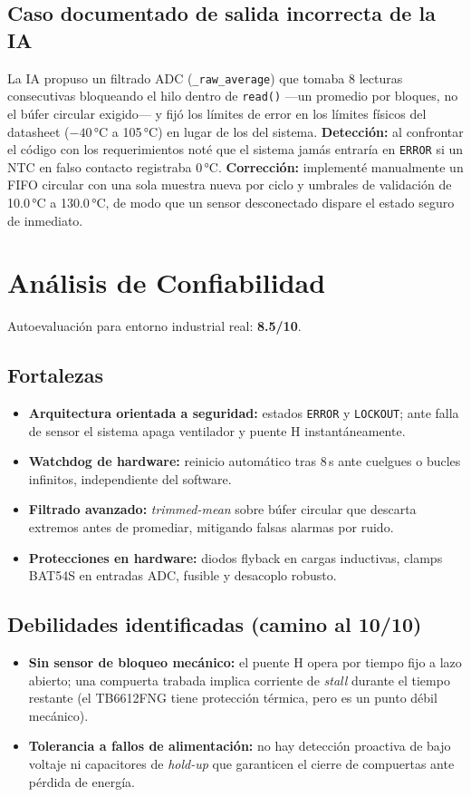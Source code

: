 \documentclass[11pt,letterpaper]{article}
\begin{document}
\subsection{Caso documentado de salida incorrecta de la IA}
La IA propuso un filtrado ADC (\texttt{\_raw\_average}) que tomaba 8 lecturas
consecutivas bloqueando el hilo dentro de \texttt{read()} ---un promedio por bloques,
no el búfer circular exigido--- y fijó los límites de error en los límites físicos del
datasheet ($-40$\,°C a 105\,°C) en lugar de los del sistema. \textbf{Detección:} al
confrontar el código con los requerimientos noté que el sistema jamás entraría en
\texttt{ERROR} si un NTC en falso contacto registraba 0\,°C. \textbf{Corrección:}
implementé manualmente un FIFO circular con una sola muestra nueva por ciclo y umbrales
de validación de 10.0\,°C a 130.0\,°C, de modo que un sensor desconectado dispare el
estado seguro de inmediato.

\section{Análisis de Confiabilidad}
Autoevaluación para entorno industrial real: \textbf{8.5/10}.

\subsection{Fortalezas}
\begin{itemize}
  \item \textbf{Arquitectura orientada a seguridad:} estados \texttt{ERROR} y \texttt{LOCKOUT}; ante falla de sensor el sistema apaga ventilador y puente H instantáneamente.
  \item \textbf{Watchdog de hardware:} reinicio automático tras 8\,s ante cuelgues o bucles infinitos, independiente del software.
  \item \textbf{Filtrado avanzado:} \emph{trimmed-mean} sobre búfer circular que descarta extremos antes de promediar, mitigando falsas alarmas por ruido.
  \item \textbf{Protecciones en hardware:} diodos flyback en cargas inductivas, clamps BAT54S en entradas ADC, fusible y desacoplo robusto.
\end{itemize}

\subsection{Debilidades identificadas (camino al 10/10)}
\begin{itemize}
  \item \textbf{Sin sensor de bloqueo mecánico:} el puente H opera por tiempo fijo a lazo abierto; una compuerta trabada implica corriente de \emph{stall} durante el tiempo restante (el TB6612FNG tiene protección térmica, pero es un punto débil mecánico).
  \item \textbf{Tolerancia a fallos de alimentación:} no hay detección proactiva de bajo voltaje ni capacitores de \emph{hold-up} que garanticen el cierre de compuertas ante pérdida de energía.
\end{itemize}
\end{document}

